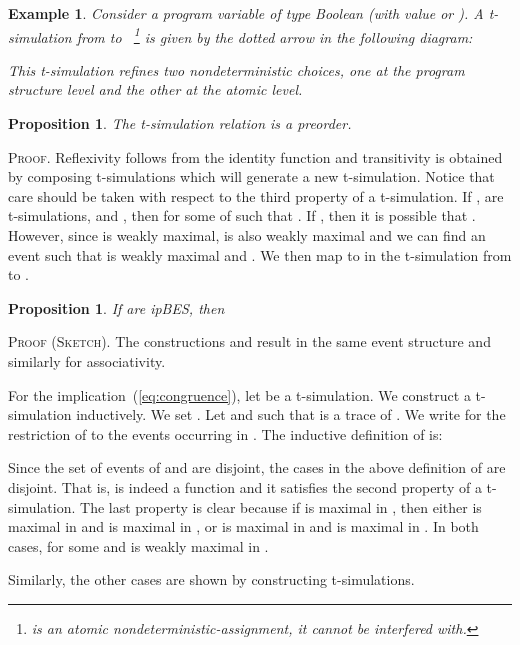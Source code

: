\documentclass[review]{elsart}
\newtheorem{proposition}[definition]{Proposition}
\newtheorem{example}[definition]{Example}
\newenvironment{proof}{\par
\noindent
\textsc{Proof. }
\noindent}{\hfill}
\newenvironment{proofsummary}{\par
\noindent
\textsc{Proof (Sketch). }
\noindent}{\hfill}
\begin{document}
\begin{example}\label{ex:t-sim}
Consider a program variable  of type Boolean (with value  or ). A t-simulation from  to ~\footnote{ is an atomic nondeterministic-assignment, it cannot be interfered with.} is given by the dotted arrow in the following diagram:

This t-simulation refines two nondeterministic choices, one at the program structure level and the other at the atomic level.
\end{example}

\begin{proposition}
The t-simulation relation  is a preorder.
\end{proposition}

\begin{proof}
Reflexivity follows from the identity function and transitivity is obtained by composing t-simulations which will generate a new t-simulation. Notice that care should be taken with respect to the third property of a t-simulation. If ,  are t-simulations,  and , then  for some  of  such that . If , then it is possible that . However, since  is weakly maximal,  is also weakly maximal and we can find an event  such that  is weakly maximal and . We then map  to  in the t-simulation from  to .
\end{proof}

\begin{proposition}\label{pro:necessary-axioms}
If  are ipBES, then

\end{proposition}

\begin{proofsummary}
The constructions  and  result in the same event structure and similarly for associativity. 

For the implication~(\ref{eq:congruence}), let  be a t-simulation. We construct a t-simulation  inductively. We set . Let  and  such that  is a trace of . We write  for the restriction of  to the events occurring in . The inductive definition of  is:

Since the set of events of  and  are disjoint, the cases in the above definition of  are disjoint. That is,  is indeed a function and it satisfies the second property of a t-simulation. The last property is clear because if  is maximal in , then either  is maximal in  and  is maximal in , or  is maximal in  and  is maximal in . In both cases,  for some  and  is weakly maximal in .

Similarly, the other cases are shown by constructing t-simulations.
\end{proofsummary}
\end{document}

